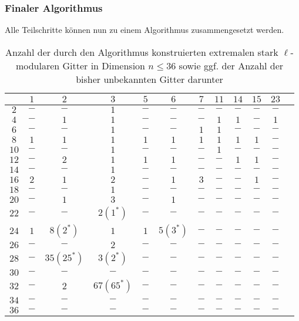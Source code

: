 \documentclass{beamer}
\begin{document}
\begin{frame}[plain]
	\frametitle{Finaler Algorithmus}
	Alle Teilschritte können nun zu einem Algorithmus zusammengesetzt werden.
\end{frame}

\begin{frame}[plain]
\begin{tiny}
\begin{table}[H]
	\centering
	\begin{tabular}{|c||c|c|c|c|c|c|c|c|c|c|c|}
		\hline
		\backslashbox{$n$}{$\ell$}	&$1$	&$2$	&$3$	&$5$	&$6$	&$7$	&$11$	&$14$	&$15$	&$23$\\ \hline \hline
		$2$		&$-$		&$-$		&$1$		&$-$		&$-$		&$-$		&$-$		&$-$		&$-$	&$-$\\ \hline
		$4$		&$-$		&$1$		&$1$		&$-$		&$-$		&$-$		&$1$		&$1$		&$-$	&$1$\\ \hline
		$6$		&$-$		&$-$		&$1$		&$-$		&$-$		&$1$		&$1$		&$-$		&$-$	&$-$\\ \hline
		$8$		&$1$		&$1$		&$1$		&$1$		&$1$		&$1$		&$1$		&$1$		&$1$	&$-$\\ \hline
		$10$	&$-$		&$-$		&$1$		&$-$		&$-$		&$-$		&$1$		&$-$		&$-$	&$-$\\ \hline
		$12$	&$-$		&$2$		&$1$		&$1$		&$1$		&$-$		&$-$		&$1$		&$1$	&$-$\\ \hline
		$14$	&$-$		&$-$		&$1$		&$-$		&$-$		&$-$		&$-$		&$-$		&$-$	&$-$\\ \hline
		$16$	&$2$		&$1$		&$2$		&$-$		&$1$		&$3$		&$-$		&$-$		&$1$	&$-$\\ \hline
		$18$	&$-$		&$-$		&$1$		&$-$		&$-$		&$-$		&$-$		&$-$		&$-$	&$-$\\ \hline
		$20$	&$-$		&$1$		&$3$		&$-$		&$1$		&$-$		&$-$		&$-$		&$-$	&$-$\\ \hline
		$22$	&$-$		&$-$		&$2(1^\ast)$&$-$		&$-$		&$-$		&$-$		&$-$		&$-$	&$-$\\ \hline
		$24$	&$1$		&$8(2^\ast)$&$1$		&$1$		&$5(3^\ast)$&$-$		&$-$		&$-$		&$-$	&$-$\\ \hline
		$26$	&$-$		&$-$		&$2$		&$-$		&$-$		&$-$		&$-$		&$-$		&$-$	&$-$\\ \hline
		$28$	&$-$		&$35(25^\ast)$&$3(2^\ast)$&$-$		&$-$		&$-$		&$-$		&$-$		&$-$	&$-$\\ \hline
		$30$	&$-$		&$-$		&$-$		&$-$		&$-$		&$-$		&$-$		&$-$		&$-$	&$-$\\ \hline
		$32$	&$-$		&$2$		&$67(65^\ast)$&$-$		&$-$		&$-$		&$-$		&$-$		&$-$	&$-$\\ \hline
		$34$	&$-$		&$-$		&$-$		&$-$		&$-$		&$-$		&$-$		&$-$		&$-$	&$-$\\ \hline
		$36$	&$-$		&$-$		&$-$		&$-$		&$-$		&$-$		&$-$		&$-$		&$-$	&$-$\\ \hline
	\end{tabular}
	\caption{Anzahl der durch den Algorithmus konstruierten extremalen stark $\ell$-modularen Gitter in Dimension $n \leq 36$ sowie ggf. der Anzahl der bisher unbekannten Gitter darunter}
\end{table}
\end{tiny}
\end{frame}
\end{document}
